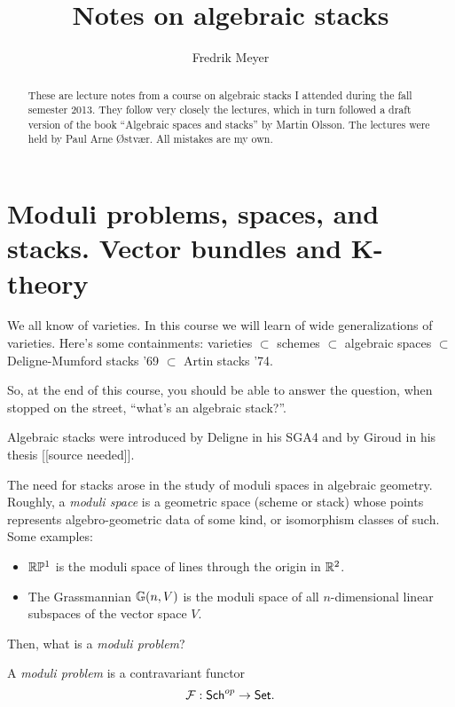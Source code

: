 \documentclass[11pt, english]{article}
\title{Notes on algebraic stacks}
\author{Fredrik Meyer}
\date{}
\begin{document}
  
\maketitle 
\begin{abstract}
These are lecture notes from a course on algebraic stacks I attended during the fall semester 2013. They follow very closely the lectures, which in turn followed a draft version of the book ``Algebraic spaces and stacks'' by Martin Olsson. The lectures were held by Paul Arne Østvær. All mistakes are my own.
\end{abstract}

\tableofcontents

\section{Moduli problems, spaces, and stacks. Vector bundles and K-theory}

We all know of varieties.  In this course we will learn of wide generalizations of varieties. Here's some containments: varieties $\subset$ schemes $\subset$ algebraic spaces $\subset$ Deligne-Mumford stacks '69 $\subset$ Artin stacks '74.

So, at the end of this course, you should be able to answer the question, when stopped on the street, ``what's an algebraic stack?''.

Algebraic stacks were introduced by Deligne in his SGA4 and by Giroud in his thesis [[source needed]].

The need for stacks arose in the study of moduli spaces in algebraic geometry. Roughly, a \emph{moduli space} is a geometric space (scheme or stack) whose points represents algebro-geometric data of some kind, or isomorphism classes of such. Some examples:

\begin{itemize}
\item $\mathbb{R}\mathbb{P}^1$ is the moduli space of lines through the origin in $\mathbb{R}^2$.
\item The Grassmannian $\mathbb{G}(n,V)$ is the moduli space of all $n$-dimensional linear subspaces of the vector space $V$.
\end{itemize}

Then, what is a \emph{moduli problem}?

\begin{defi}
A \emph{moduli problem} is a contravariant functor
\[ \mathcal F : \mathsf{Sch}^{op} \to \mathsf{Set}.
\]
\end{defi}
\end{document}
